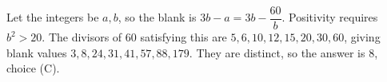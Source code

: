 Let the integers be $a,b$, so the blank is $3b-a=3b-\dfrac{60}{b}$. Positivity requires $b^2>20$. The divisors of $60$ satisfying this are $5,6,10,12,15,20,30,60$, giving blank values $3,8,24,31,41,57,88,179$. They are distinct, so the answer is $\boxed8$, choice (C).
